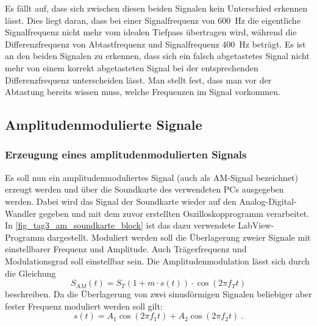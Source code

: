 \documentclass[
a4paper,
12pt,
pagesize,
ngerman
]{scrartcl}
\begin{document}
	Es fällt auf, dass sich zwischen diesen beiden Signalen kein Unterschied erkennen lässt.
	Dies liegt daran, dass bei einer Signalfrequenz von \SI{600}{\hertz} die eigentliche Signalfrequenz nicht mehr vom idealen Tiefpass übertragen wird, während die Differenzfrequenz von Abtastfrequenz und Signalfrequenz \SI{400}{\hertz} beträgt.
	Es ist an den beiden Signalen zu erkennen, dass sich ein falsch abgetastetes Signal nicht mehr von einem korrekt abgetasteten Signal bei der entsprechenden Differenzfrequenz unterscheiden lässt.
	Man stellt fest, dass man vor der Abtastung bereits wissen muss, welche Frequenzen im Signal vorkommen. 
	
	
	\subsection{Amplitudenmodulierte Signale}

	\subsubsection{Erzeugung eines amplitudenmodulierten Signals} \label{AMSignalErzeugung}
	
	Es soll nun ein amplitudenmoduliertes Signal (auch als AM-Signal bezeichnet) erzeugt werden und über die Soundkarte des verwendeten PCs ausgegeben werden.
	Dabei wird das Signal der Soundkarte wieder auf den Analog-Digital-Wandler gegeben und mit dem zuvor erstellten Oszilloskopprogramm verarbeitet.
	In \cref{fig_tag3_am_soundkarte_block} ist das dazu verwendete LabView-Programm dargestellt.
	Moduliert werden soll die Überlagerung zweier Signale mit einstellbarer Frequenz und Amplitude.
	Auch Trägerfrequenz und Modulationsgrad soll einstellbar sein.
	Die Amplitudenmodulation lässt sich durch die Gleichung
	\begin{equation} \label{AMFormel}
		S_{AM}(t)=S_T (1+m \cdot s(t)) \cdot \cos(2\pi f_T t)
	\end{equation}
	beschreiben.
	Da die Überlagerung von zwei sinusförmigen Signalen beliebiger aber fester Frequenz moduliert werden soll gilt:
	\begin{equation} \label{Ursprungssignal}
		s(t) = A_1 \cos (2\pi f_1 t) + A_2 \cos (2\pi f_2 t) \ . 
	\end{equation}
	
\end{document}
